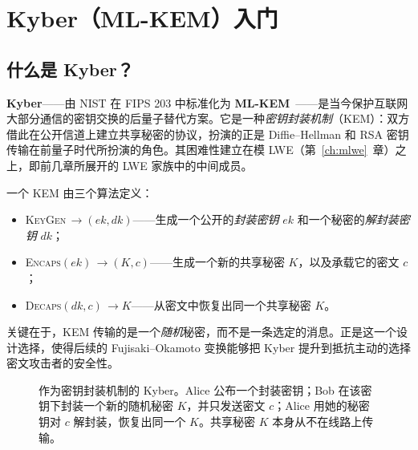 \chapter{Kyber（ML-KEM）入门}
\label{ch:toymlkem}

\section{什么是 Kyber？}

\textbf{Kyber}——由 NIST 在 FIPS 203 中标准化为 \textbf{ML-KEM}~\cite{fips203,kyber2018}——是当今保护互联网大部分通信的密钥交换的后量子替代方案。它是一种\emph{密钥封装机制}（KEM）：双方借此在公开信道上建立共享秘密的协议，扮演的正是 Diffie--Hellman 和 RSA 密钥传输在前量子时代所扮演的角色。其困难性建立在模 LWE（第~\ref{ch:mlwe}~章）之上，即前几章所展开的 LWE 家族中的中间成员。

一个 KEM 由三个算法定义：

\begin{itemize}
  \item \textsc{KeyGen}\,$\to (ek, dk)$——生成一个公开的\emph{封装密钥} $ek$ 和一个秘密的\emph{解封装密钥} $dk$；
  \item \textsc{Encaps}$(ek)\,\to (K, c)$——生成一个新的共享秘密 $K$，以及承载它的密文 $c$；
  \item \textsc{Decaps}$(dk, c)\,\to K$——从密文中恢复出同一个共享秘密 $K$。
\end{itemize}

关键在于，KEM 传输的是一个\emph{随机}秘密，而不是一条选定的消息。正是这一个设计选择，使得后续的 Fujisaki–Okamoto 变换能够把 Kyber 提升到抵抗主动的选择密文攻击者的安全性。

\begin{figure}[H]
\centering
{}
\caption{作为密钥封装机制的 Kyber。Alice 公布一个封装密钥；Bob 在该密钥下封装一个新的随机秘密 $K$，并只发送密文 $c$；Alice 用她的秘密钥对 $c$ 解封装，恢复出同一个 $K$。共享秘密 $K$ 本身从不在线路上传输。}
\label{fig:kyber-kem}
\end{figure}

